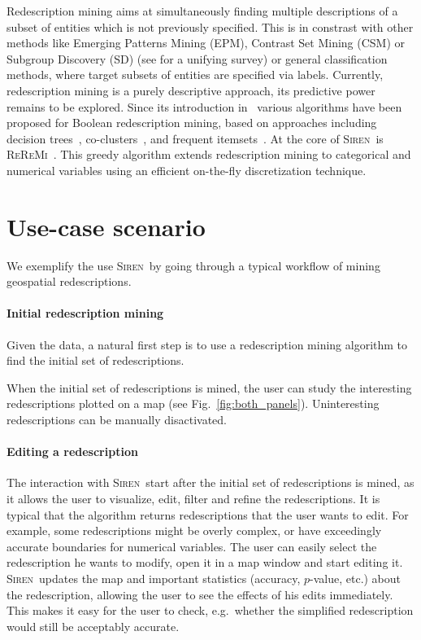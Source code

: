 \documentclass{sig-alternate}
\newcommand{\prg}[1]{\paragraph{#1}}
\newcommand{\Siren}{\textsc{Siren}}
\newcommand{\ReReMi}{\textsc{ReReMi}}
\begin{document}
Redescription mining
aims at simultaneously finding multiple descriptions of a subset of
entities which is not previously specified.
This is in constrast with other methods like Emerging Patterns Mining
(EPM), Contrast Set Mining (CSM) or Subgroup Discovery (SD) (see
\cite{kralj09supervised} for a unifying survey) or general classification methods, where target subsets of entities are specified via labels. 
Currently, redescription mining is a purely descriptive approach, its
predictive power remains to be explored.
 Since its introduction
in~\cite{ramakrishnan04turning} various algorithms have been proposed
for Boolean redescription mining, based on approaches including
decision trees~\cite{ramakrishnan04turning,kumar07redescription},
co-clusters~\cite{parida05redescription}, and frequent
itemsets~\cite{gallo08finding}.  
At the core of \Siren\
is \ReReMi~\cite{galbrun11black}. This greedy algorithm extends redescription
mining to categorical and numerical variables using an efficient
on-the-fly discretization technique.


\section{Use-case scenario}
\label{sec:scenarios}
We exemplify the use \Siren\ by going through a typical workflow
of mining geospatial redescriptions.

\prg{Initial redescription mining}
Given the data, a natural first step is to use a redescription mining
algorithm to find the initial set of redescriptions. 

When the initial set of redescriptions is mined, the user can study the
interesting redescriptions plotted on a map (see
Fig.~\ref{fig:both_panels}).
Uninteresting redescriptions can be manually disactivated.

 
\prg{Editing a redescription} 
The interaction with \Siren\ start after the initial set of
redescriptions is mined, as it allows the user to visualize, edit,
filter and refine the redescriptions.  It is typical that the
algorithm returns redescriptions that the user wants to edit. For
example, some redescriptions might be overly complex, or have
exceedingly accurate boundaries for numerical variables. The user can
easily select the redescription he wants to modify, open it in a map
window and start editing it. \Siren\ updates the map and important
statistics (accuracy, $p$-value, etc.) about the redescription,
allowing the user to see the effects of his edits immediately. This
makes it easy for the user to check, e.g.\ whether the simplified
redescription would still be acceptably accurate.
\end{document}
